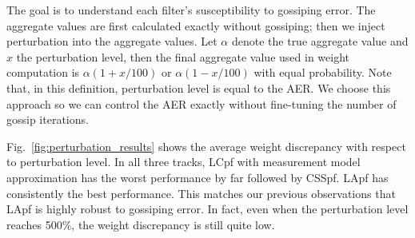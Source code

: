\documentclass[10pt,letterpaper,final]{article}
\begin{document}
The goal is to understand each filter's susceptibility to gossiping error. The aggregate values are first calculated exactly without gossiping; then we inject perturbation into the aggregate values. Let $\alpha$ denote the true aggregate value and $x$ the perturbation level, then the final aggregate value used in weight computation is $\alpha(1+ x/100)$ or $\alpha(1- x/100)$ with equal probability. Note that, in this definition, perturbation level is equal to the AER. We choose this approach so we can control the AER exactly without fine-tuning the number of gossip iterations. 

Fig.~\ref{fig:perturbation_results} shows the average weight discrepancy with respect to perturbation level. In all three tracks, LCpf with measurement model approximation has the worst performance by far followed by CSSpf. LApf has consistently the best performance. This matches our previous observations that LApf is highly robust to gossiping error. In fact, even when the perturbation level reaches 500\%, the weight discrepancy is still quite low. 
\end{document}
